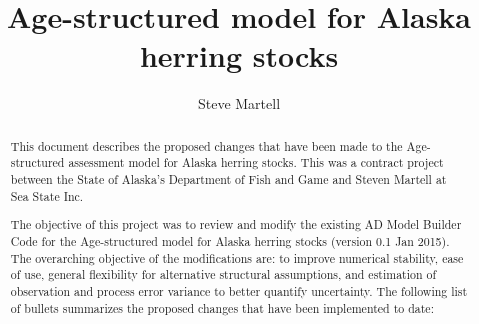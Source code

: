 \documentclass[12pt,letterpaper]{article}
\title{Age-structured model for Alaska herring stocks}
\author{Steve Martell}
\begin{document}
  \maketitle
  \renewcommand{\abstractname}{Executive Summary}
  \begin{abstract}
    This document describes the proposed changes that have been made to the Age-structured assessment model for Alaska herring stocks. This was a contract project between the State of Alaska's Department of Fish and Game and Steven Martell at Sea State Inc.

    The objective of this project was to review and modify the existing AD Model Builder Code for the Age-structured model for Alaska herring stocks (version 0.1 Jan 2015).  The overarching objective of the modifications are:  to improve numerical stability, ease of use, general flexibility for alternative structural assumptions, and estimation of observation and process error variance to better quantify uncertainty. The following list of bullets summarizes the proposed changes that have been implemented to date:


\end{abstract}
\end{document}
